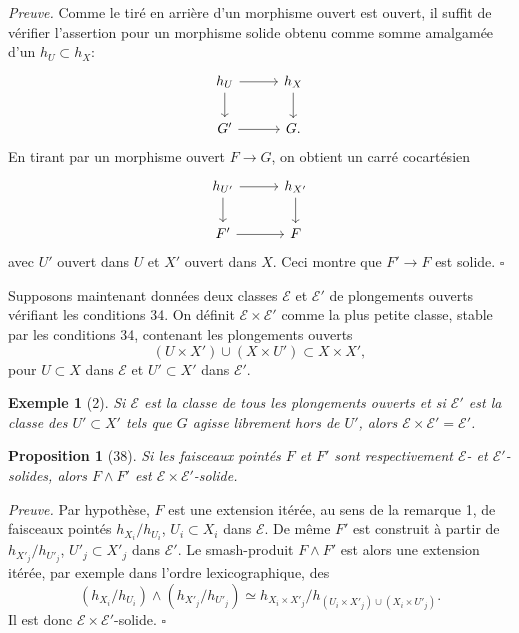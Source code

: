 \documentclass[11pt]{article}
\theoremstyle{deligne}
\newtheorem*{proposition*}{Proposition}
\newtheorem*{example*}{Exemple}
\newenvironment{proofdel}{\noindent\textit{Preuve.}}{\hfill$\square$}
\begin{document}
\begin{proofdel}
Comme le tiré en arrière d'un morphisme ouvert est ouvert, il suffit de vérifier l'assertion pour un morphisme solide obtenu comme somme amalgamée d'un \(h_U\subset h_X\):
\[
\begin{tikzcd}[column sep=2.8em,row sep=1.8em]
h_U \arrow[r] \arrow[d] & h_X \arrow[d]\\
G' \arrow[r] & G .
\end{tikzcd}
\]
En tirant par un morphisme ouvert \(F\to G\), on obtient un carré cocartésien
\[
\begin{tikzcd}[column sep=2.8em,row sep=1.8em]
h_{U'} \arrow[r] \arrow[d] & h_{X'} \arrow[d]\\
F' \arrow[r] & F
\end{tikzcd}
\]
avec \(U'\) ouvert dans \(U\) et \(X'\) ouvert dans \(X\). Ceci montre que \(F'\to F\) est solide.
\end{proofdel}

Supposons maintenant données deux classes \(\mathcal E\) et \(\mathcal E'\) de plongements ouverts vérifiant les conditions 34. On définit \(\mathcal E\times\mathcal E'\) comme la plus petite classe, stable par les conditions 34, contenant les plongements ouverts
\[
(U\times X')\cup(X\times U')\subset X\times X',
\]
pour \(U\subset X\) dans \(\mathcal E\) et \(U'\subset X'\) dans \(\mathcal E'\).

\begin{example*}[2]
Si \(\mathcal E\) est la classe de tous les plongements ouverts et si \(\mathcal E'\) est la classe des \(U'\subset X'\) tels que \(G\) agisse librement hors de \(U'\), alors \(\mathcal E\times\mathcal E'=\mathcal E'\).
\end{example*}

\begin{proposition*}[38]
Si les faisceaux pointés \(F\) et \(F'\) sont respectivement \(\mathcal E\)- et \(\mathcal E'\)-solides, alors \(F\wedge F'\) est \(\mathcal E\times\mathcal E'\)-solide.
\end{proposition*}

\begin{proofdel}
Par hypothèse, \(F\) est une extension itérée, au sens de la remarque 1, de faisceaux pointés \(h_{X_i}/h_{U_i}\), \(U_i\subset X_i\) dans \(\mathcal E\). De même \(F'\) est construit à partir de \(h_{X'_j}/h_{U'_j}\), \(U'_j\subset X'_j\) dans \(\mathcal E'\). Le smash-produit \(F\wedge F'\) est alors une extension itérée, par exemple dans l'ordre lexicographique, des
\[
(h_{X_i}/h_{U_i})\wedge(h_{X'_j}/h_{U'_j})
\simeq
h_{X_i\times X'_j}\big/
h_{(U_i\times X'_j)\cup(X_i\times U'_j)}.
\]
Il est donc \(\mathcal E\times\mathcal E'\)-solide.
\end{proofdel}
\end{document}

